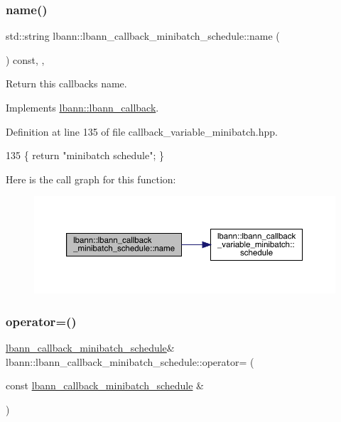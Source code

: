 \subsubsection{\texorpdfstring{name()}{name()}}
{\footnotesize\ttfamily std\+::string lbann\+::lbann\+\_\+callback\+\_\+minibatch\+\_\+schedule\+::name (\begin{DoxyParamCaption}{ }\end{DoxyParamCaption}) const\hspace{0.3cm}{\ttfamily [inline]}, {\ttfamily [override]}, {\ttfamily [virtual]}}

Return this callback\textquotesingle{}s name. 

Implements \hyperlink{classlbann_1_1lbann__callback_a7522c7a14f1d6a1ea762cc2d7248eb3a}{lbann\+::lbann\+\_\+callback}.



Definition at line 135 of file callback\+\_\+variable\+\_\+minibatch.\+hpp.


\begin{DoxyCode}
135 \{ \textcolor{keywordflow}{return} \textcolor{stringliteral}{"minibatch schedule"}; \}
\end{DoxyCode}
Here is the call graph for this function\+:\nopagebreak
\begin{figure}[H]
\begin{center}
\leavevmode
\includegraphics[width=350pt]{classlbann_1_1lbann__callback__minibatch__schedule_a2bb62cf45d2f7417cddcf79843ce3e2b_cgraph}
\end{center}
\end{figure}
\mbox{\label{classlbann_1_1lbann__callback__minibatch__schedule_aed9c1240268ca4f2cd0d77f2f5a4ec3f}} 
\subsubsection{\texorpdfstring{operator=()}{operator=()}}
{\footnotesize\ttfamily \hyperlink{classlbann_1_1lbann__callback__minibatch__schedule}{lbann\+\_\+callback\+\_\+minibatch\+\_\+schedule}\& lbann\+::lbann\+\_\+callback\+\_\+minibatch\+\_\+schedule\+::operator= (\begin{DoxyParamCaption}\item[{const \hyperlink{classlbann_1_1lbann__callback__minibatch__schedule}{lbann\+\_\+callback\+\_\+minibatch\+\_\+schedule} \&}]{ }\end{DoxyParamCaption})\hspace{0.3cm}{\ttfamily [default]}}

